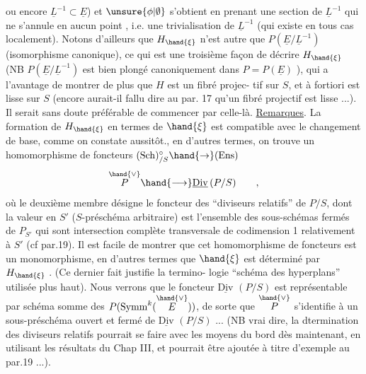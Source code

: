 
ou encore $\underline{L}^{-1}\subset\underline{E}$) et $\unsure{\phi|\emptyset}$ s'obtient en prenant une section de $\underline{L}^{-1}$ qui
ne s'annule en aucun point , i.e. une trivialisation de $\underline{L}^{-1}$
(qui existe en tous cas localement). Notons d'ailleurs que $H_{\hand{\xi}}$ n'est
autre que $P(\underline{E}/\underline{L}^{-1})$ (isomorphisme canonique), ce qui est une troisième
façon de décrire $H_{\hand{\xi}}$ (NB $P(\underline{E}/\underline{L}^{-1})$ est bien plongé canoniquement dans
$P = P(\underline{E})$ ), qui a l'avantage de montrer de plus que $H$ est un fibré projec-%
tif sur $S$, et à fortiori est lisse sur $S$ (encore aurait-il fallu dire 
\margin{$\|$} au par. 17 qu'un fibré projectif est lisse ...). Il serait sans doute
\margin{$\|$} préférable de commencer par celle-là.
\uline{Remarques}. La formation de $H_{\hand{\xi}}$ en termes de $\hand{\xi}$ est compatible avec
le changement de base, comme on constate aussitôt., en d'autres termes,
on trouve un homomorphisme de foncteurs $(\mathrm{Sch})^{\circ}_{/S}\hand{\to}(\mathrm{Ens})$
\[ \overset{\hand{\vee}}{P} \hand{\longrightarrow} \underline{\mathrm{Div}}\,(P/S) \qquad , \]
où le deuxième membre désigne le foncteur des ``diviseurs relatifs'' de $P/S$,
dont la valeur en $S'$ ($S$-préschéma arbitraire) est l'ensemble des
sous-schémas fermés de $P_{S'}$ qui sont intersection complète transversale
de codimension 1 relativement à $S'$ (cf par.19). Il est facile de montrer
que cet homomorphisme de foncteurs est un monomorphisme, en d'autres
termes que $\hand{\xi}$ est déterminé par $H_{\hand{\xi}}$ . (Ce dernier fait justifie la termino-%
logie ``schéma des hyperplans'' utilisée plus haut). Nous verrons  \margin{)}
 que le foncteur $\underline{\mathrm{Div}}$ $(P/S)$ est représentable par schéma somme
des $P(\mathrm{Symm}^{k}(\overset{\hand{\vee}}{E}))$, de sorte que $\overset{\hand{\vee}}{P}$ s'identifie à un sous-préschéma ouvert
et fermé de $\underline{\mathrm{Div}}$ $(P/S)$ ... (NB  vrai dire, la dtermination des diviseurs
\margin{$|$} relatifs pourrait se faire avec les moyens du bord dès maintenant, en
\margin{$|$} utilisant les résultats du Chap III, et pourrait être ajoutée  à titre
\margin{$|$} d'exemple au par.19 ...).


